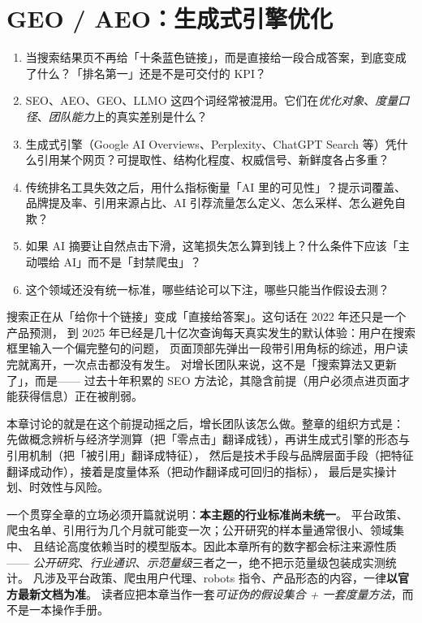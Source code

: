 \chapter{GEO / AEO：生成式引擎优化}
\label{ch:geo}

\begin{insight}[本章要解决的问题]
\begin{enumerate}
  \item 当搜索结果页不再给「十条蓝色链接」，而是直接给一段合成答案，到底变成了什么？「排名第一」还是不是可交付的 KPI？
  \item SEO、AEO、GEO、LLMO 这四个词经常被混用。它们在\emph{优化对象}、\emph{度量口径}、\emph{团队能力}上的真实差别是什么？
  \item 生成式引擎（Google AI Overviews、Perplexity、ChatGPT Search 等）凭什么引用某个网页？可提取性、结构化程度、权威信号、新鲜度各占多重？
  \item 传统排名工具失效之后，用什么指标衡量「AI 里的可见性」？提示词覆盖、品牌提及率、引用来源占比、AI 引荐流量怎么定义、怎么采样、怎么避免自欺？
  \item 如果 AI 摘要让自然点击下滑，这笔损失怎么算到钱上？什么条件下应该「主动喂给 AI」而不是「封禁爬虫」？
  \item 这个领域还没有统一标准，哪些结论可以下注，哪些只能当作假设去测？
\end{enumerate}
\end{insight}

搜索正在从「给你十个链接」变成「直接给答案」。这句话在 2022 年还只是一个产品预测，
到 2025 年已经是几十亿次查询每天真实发生的默认体验：用户在搜索框里输入一个偏完整句的问题，
页面顶部先弹出一段带引用角标的综述，用户读完就离开，一次点击都没有发生。
对增长团队来说，这不是「搜索算法又更新了」，而是——
过去十年积累的 SEO 方法论，其隐含前提（用户必须点进页面才能获得信息）正在被削弱。

本章讨论的就是在这个前提动摇之后，增长团队该怎么做。整章的组织方式是：
先做概念辨析与经济学测算（把「零点击」翻译成钱），再讲生成式引擎的形态与引用机制（把「被引用」翻译成特征），
然后是技术手段与品牌层面手段（把特征翻译成动作），接着是度量体系（把动作翻译成可回归的指标），
最后是实操计划、时效性与风险。

一个贯穿全章的立场必须开篇就说明：\textbf{本主题的行业标准尚未统一}。
平台政策、爬虫名单、引用行为几个月就可能变一次；公开研究的样本量通常很小、领域集中、
且结论高度依赖当时的模型版本。因此本章所有的数字都会标注来源性质——
\emph{公开研究}、\emph{行业通识}、\emph{示范量级}三者之一，绝不把示范量级包装成实测统计。
凡涉及平台政策、爬虫用户代理、robots 指令、产品形态的内容，一律\textbf{以官方最新文档为准}。
读者应把本章当作一套\emph{可证伪的假设集合 + 一套度量方法}，而不是一本操作手册。

